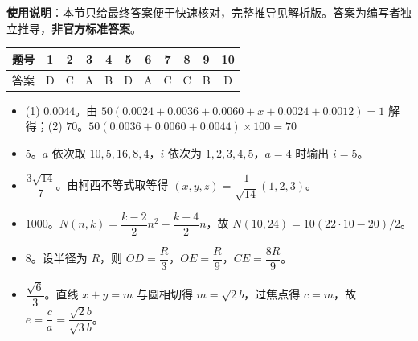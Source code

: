 
\begin{gknotice}
\textbf{使用说明}：本节只给最终答案便于快速核对，完整推导见解析版。答案为编写者独立推导，\textbf{非官方标准答案}。
\end{gknotice}

\begin{center}\begin{tabular}{ccccccccccc}
\toprule
题号 & 1 & 2 & 3 & 4 & 5 & 6 & 7 & 8 & 9 & 10 \\
\midrule
答案 & D & C & A & B & D & A & C & C & B & D \\
\bottomrule
\end{tabular}\end{center}

\begin{itemize}[leftmargin=2.6em]
  \item[\textbf{11.}] (1) $0.0044$。由 $50(0.0024+0.0036+0.0060+x+0.0024+0.0012)=1$ 解得；(2) $70$。$50(0.0036+0.0060+0.0044)\times100=70$
  \item[\textbf{12.}] $5$。$a$ 依次取 $10,5,16,8,4$，$i$ 依次为 $1,2,3,4,5$，$a=4$ 时输出 $i=5$。
  \item[\textbf{13.}] $\dfrac{3\sqrt{14}}{7}$。由柯西不等式取等得 $(x,y,z)=\dfrac1{\sqrt{14}}(1,2,3)$。
  \item[\textbf{14.}] $1000$。$N(n,k)=\dfrac{k-2}{2}n^2-\dfrac{k-4}{2}n$，故 $N(10,24)=10(22\cdot10-20)/2$。
  \item[\textbf{15.}] $8$。设半径为 $R$，则 $OD=\dfrac R3$，$OE=\dfrac R9$，$CE=\dfrac{8R}{9}$。
  \item[\textbf{16.}] $\dfrac{\sqrt6}{3}$。直线 $x+y=m$ 与圆相切得 $m=\sqrt2b$，过焦点得 $c=m$，故 $e=\dfrac{c}{a}=\dfrac{\sqrt2b}{\sqrt3b}$。
\end{itemize}

